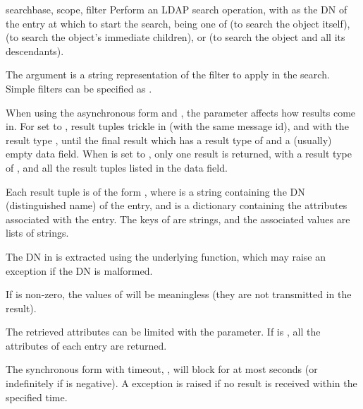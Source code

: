 
\begin{methoddesc}[LDAP]{search}{base, scope, filter } %
Perform an LDAP search operation, with  as the DN of the entry
at which to start the search,  being one of 
 (to search the object itself), 
 (to search the object's immediate children), or
 (to search the object and all its descendants).

The
 argument is a string representation of the filter to apply in
the search. Simple filters can be specified as
.

\begin{seealso}
\end{seealso}

When using the asynchronous form and , the 
parameter affects how results come in.
For  set to , 
result tuples trickle in (with the same message id), and with the result
type , until the final result which has 
a result type of  and a (usually) empty data field.
When  is set to , only one result is returned, with a
result type of , and all the result tuples listed 
in the data field.

Each result tuple is of the form , 
where  is a string containing
the DN (distinguished name) of the entry, and 
 is a dictionary
containing the attributes associated with the entry. 
The keys of  are strings, 
and the associated values are lists of strings.

The DN in  is extracted using the underlying 
function,
which may raise an exception if the DN is malformed.

If  is non-zero, the values of  will be meaningless
(they are not transmitted in the result).

The retrieved attributes can be limited with the  parameter.
If  is , all the attributes of each entry are returned.

The synchronous form with timeout, , will block for at most
 seconds (or indefinitely if  is negative). A
 exception is raised if no result is received within the
specified time.
\end{methoddesc}

